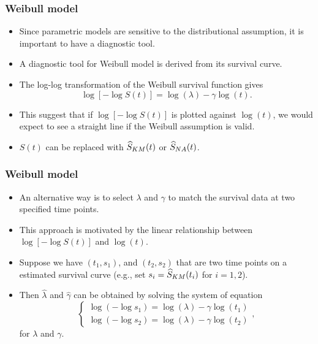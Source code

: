 \documentclass[10pt]{beamer}\usepackage[]{graphicx}\usepackage[]{color}
\newcommand{\Skm}{\widehat{S}_{\scriptsize{KM}}}
\newcommand{\Sna}{\widehat{S}_{\scriptsize{NA}}}
\begin{document}
\begin{frame}
  \frametitle{Weibull model}
  \begin{itemize}
  \item Since parametric models are sensitive to the distributional assumption,
    it is important to have a diagnostic tool.
  \item A diagnostic tool for Weibull model is derived from its survival curve. 
  \item The log-log transformation of the Weibull survival function gives
    $$\log[-\log S(t)] = \log(\lambda) - \gamma\log(t).$$
  \item This suggest that if $\log[-\log S(t)]$ is plotted against $\log(t)$, 
    we would expect to see a straight line if the Weibull assumption is valid. 
  \item $S(t)$ can be replaced with $\Skm(t)$ or $\Sna(t)$.
  \end{itemize}  
\end{frame}

\begin{frame}
  \frametitle{Weibull model}
  \begin{itemize}    
  \item An alternative way is to select $\lambda$ and $\gamma$ to match the
    survival data at two specified time points.
  \item This approach is motivated by the linear relationship between $\log\left[-\log S(t)\right]$
    and $\log(t)$.
  \item Suppose we have $(t_1, s_1)$, and $(t_2, s_2)$ that are two time points on 
    a estimated survival curve (e.g., set $s_i = \Skm(t_i)$ for $i = 1, 2$).
  \item Then $\hat\lambda$ and $\hat\gamma$ can be obtained by solving the system of equation
    $$ \left\{\begin{matrix}
\log\left(-\log s_1\right) = \log(\lambda) - \gamma\log(t_1) \\ 
\log\left(-\log s_2\right) = \log(\lambda) - \gamma\log(t_2)
\end{matrix}\right.,$$
    for $\lambda$ and $\gamma$.
  \end{itemize}  
\end{frame}
\end{document}
